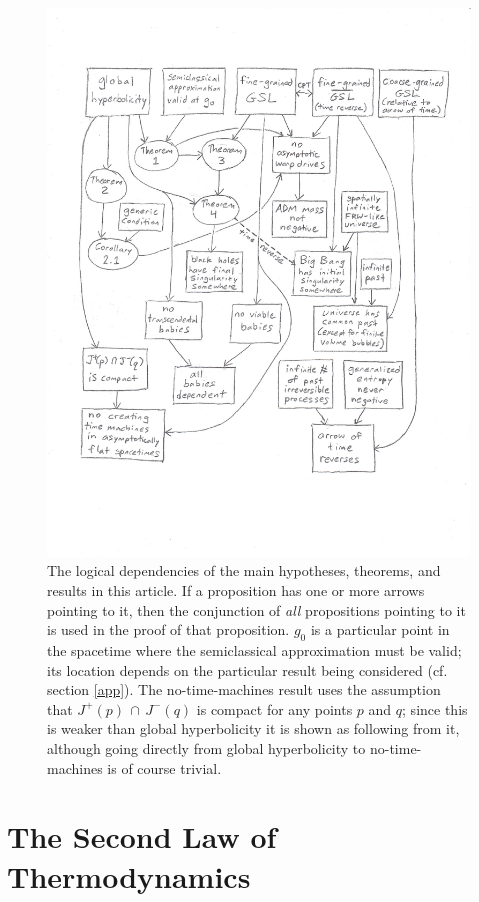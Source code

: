 \documentclass[12pt]{article}
\begin{document}
\begin{figure}[p]
\centering
\includegraphics[width=1.1\textwidth, trim=0 1.5in 0 0, clip=true]{chart.eps}
\caption{The logical dependencies of the main hypotheses, theorems, and results in this article.  If a proposition has one or more arrows pointing to it, then the conjunction of \emph{all} propositions pointing to it is used in the proof of that proposition.  $g_0$ is a particular point in the spacetime where the semiclassical approximation must be valid; its location depends on the particular result being considered (cf. section \ref{app}).  The no-time-machines result uses the assumption that $J^+(p)\,\cap\,J^{-}(q)$ is compact for any points $p$ and $q$; since this is weaker than global hyperbolicity it is shown as following from it, although going directly from global hyperbolicity to no-time-machines is of course trivial.}\label{chart}
\end{figure}

\section{The Second Law of Thermodynamics}\label{second}
\end{document}
